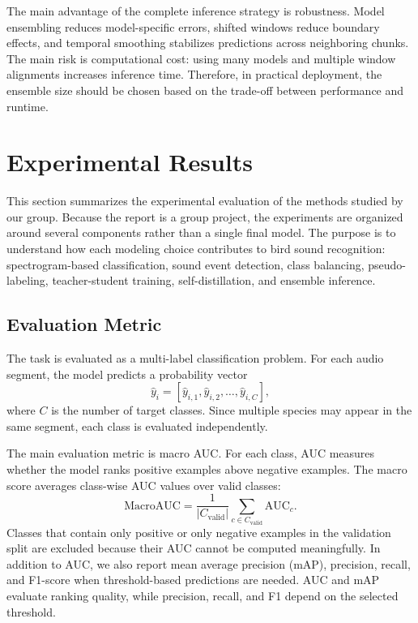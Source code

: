 \documentclass[a4paper,12pt]{article}
\begin{document}
The main advantage of the complete inference strategy is robustness. Model ensembling reduces model-specific errors, shifted windows reduce boundary effects, and temporal smoothing stabilizes predictions across neighboring chunks. The main risk is computational cost: using many models and multiple window alignments increases inference time. Therefore, in practical deployment, the ensemble size should be chosen based on the trade-off between performance and runtime.


\section{Experimental Results}
This section summarizes the experimental evaluation of the methods studied by our group. Because the report is a group project, the experiments are organized around several components rather than a single final model. The purpose is to understand how each modeling choice contributes to bird sound recognition: spectrogram-based classification, sound event detection, class balancing, pseudo-labeling, teacher-student training, self-distillation, and ensemble inference.

\subsection{Evaluation Metric}
The task is evaluated as a multi-label classification problem. For each audio segment, the model predicts a probability vector
\[
\hat{y}_i=[\hat{y}_{i,1},\hat{y}_{i,2},\ldots,\hat{y}_{i,C}],
\]
where $C$ is the number of target classes. Since multiple species may appear in the same segment, each class is evaluated independently.

The main evaluation metric is macro AUC. For each class, AUC measures whether the model ranks positive examples above negative examples. The macro score averages class-wise AUC values over valid classes:
\[
\mathrm{MacroAUC}=\frac{1}{|C_{\mathrm{valid}}|}\sum_{c\in C_{\mathrm{valid}}}\mathrm{AUC}_c.
\]
Classes that contain only positive or only negative examples in the validation split are excluded because their AUC cannot be computed meaningfully. In addition to AUC, we also report mean average precision (mAP), precision, recall, and F1-score when threshold-based predictions are needed. AUC and mAP evaluate ranking quality, while precision, recall, and F1 depend on the selected threshold.
\end{document}
